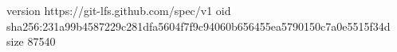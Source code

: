 version https://git-lfs.github.com/spec/v1
oid sha256:231a99b4587229c281dfa5604f7f9c94060b656455ea5790150c7a0e5515f34d
size 87540
